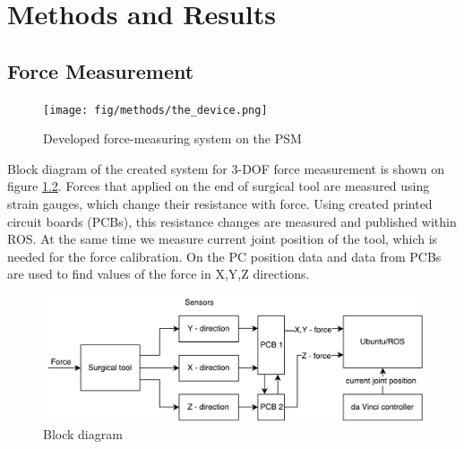 \chapter{Methods and Results}
\label{methods} %

\section{Force Measurement}
\label{sec:sysArch}

\begin{figure}[h]
	\begin{center}
		\texttt{[image: fig/methods/the\_device.png]}
	\end{center}
	\vspace{-4mm}
	\caption[Developed force-measuring system on the PSM]
	{Developed force-measuring system on the PSM}
	\label{fig:PSM_with_FF}
	\vspace{-2mm}
\end{figure}

Block diagram of the created system for 3-DOF force measurement is shown on figure \ref{fig:BlockDiag}. Forces that applied on the end of surgical tool are measured using strain gauges, which change their resistance with force. Using created printed circuit boards (PCBs), this resistance changes are measured and published within ROS. At the same time we measure current joint position of the tool, which is needed for the force calibration. On the PC position data and data from PCBs are used to find values of the force in X,Y,Z directions.

\begin{figure}[h]
	\begin{center}
		\includegraphics[width=140mm]{fig/methods/dbd2.pdf}
	\end{center}
	\vspace{-4mm}
	\caption[Block diagram]
	{Block diagram}
	\label{fig:BlockDiag}
	\vspace{-2mm}
\end{figure}

